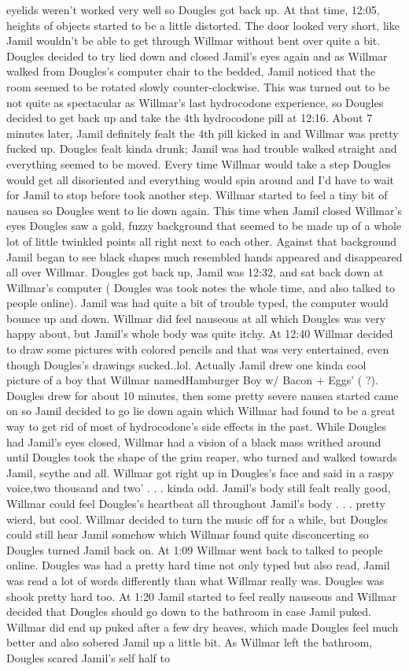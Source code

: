 \documentclass[12pt]{book}
\begin{document}
eyelids weren't worked very well so Dougles got back up. At that time, 12:05, heights of objects started to be a little distorted. The door looked very short, like Jamil wouldn't be able to get through Willmar without bent over quite a bit. Dougles decided to try lied down and closed Jamil's eyes again and as Willmar walked from Dougles's computer chair to the bedded, Jamil noticed that the room seemed to be rotated slowly counter-clockwise. This was turned out to be not quite as spectacular as Willmar's last hydrocodone experience, so Dougles decided to get back up and take the 4th hydrocodone pill at 12:16. About 7 minutes later, Jamil definitely fealt the 4th pill kicked in and Willmar was pretty fucked up. Dougles fealt kinda drunk; Jamil was had trouble walked straight and everything seemed to be moved. Every time Willmar would take a step Dougles would get all disoriented and everything would spin around and I'd have to wait for Jamil to stop before took another step. Willmar started to feel a tiny bit of nausea so Dougles went to lie down again. This time when Jamil closed Willmar's eyes Dougles saw a gold, fuzzy background that seemed to be made up of a whole lot of little twinkled points all right next to each other. Against that background Jamil began to see black shapes much resembled hands appeared and disappeared all over Willmar. Dougles got back up, Jamil was 12:32, and sat back down at Willmar's computer ( Dougles was took notes the whole time, and also talked to people online). Jamil was had quite a bit of trouble typed, the computer would bounce up and down. Willmar did feel nauseous at all which Dougles was very happy about, but Jamil's whole body was quite itchy. At 12:40 Willmar decided to draw some pictures with colored pencils and that was very entertained, even though Dougles's drawings sucked..lol. Actually Jamil drew one kinda cool picture of a boy that Willmar namedHamburger Boy w/ Bacon + Eggs' ( ?). Dougles drew for about 10 minutes, then some pretty severe nausea started came on so Jamil decided to go lie down again which Willmar had found to be a great way to get rid of most of hydrocodone's side effects in the past. While Dougles had Jamil's eyes closed, Willmar had a vision of a black mass writhed around until Dougles took the shape of the grim reaper, who turned and walked towards Jamil, scythe and all. Willmar got right up in Dougles's face and said in a raspy voice,two thousand and two' . . .  kinda odd. Jamil's body still fealt really good, Willmar could feel Dougles's heartbeat all throughout Jamil's body . . .  pretty wierd, but cool. Willmar decided to turn the music off for a while, but Dougles could still hear Jamil somehow which Willmar found quite disconcerting so Dougles turned Jamil back on. At 1:09 Willmar went back to talked to people online. Dougles was had a pretty hard time not only typed but also read, Jamil was read a lot of words differently than what Willmar really was. Dougles was shook pretty hard too. At 1:20 Jamil started to feel really nauseous and Willmar decided that Dougles should go down to the bathroom in case Jamil puked. Willmar did end up puked after a few dry heaves, which made Dougles feel much better and also sobered Jamil up a little bit. As Willmar left the bathroom, Dougles scared Jamil's self half to 
\end{document}

